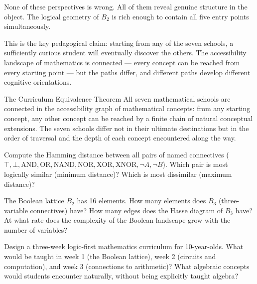 None of these perspectives is wrong. All of them reveal genuine structure
in the object. The logical geometry of $B_2$ is rich enough to contain
all five entry points simultaneously.

This is the key pedagogical claim: starting from any of the seven schools,
a sufficiently curious student will eventually discover the others.
The accessibility landscape of mathematics is connected — every concept
can be reached from every starting point — but the paths differ, and
different paths develop different cognitive orientations.

\begin{namedthm}{The Curriculum Equivalence Theorem}
  All seven mathematical schools are connected in the accessibility
  graph of mathematical concepts: from any starting concept, any other
  concept can be reached by a finite chain of natural conceptual
  extensions. The seven schools differ not in their ultimate destinations
  but in the order of traversal and the depth of each concept encountered
  along the way.
\end{namedthm}

\begin{exercise}
  Compute the Hamming distance between all pairs of named connectives
  ($\top, \bot, \mathrm{AND}, \mathrm{OR}, \mathrm{NAND}, \mathrm{NOR},
  \mathrm{XOR}, \mathrm{XNOR}, \neg A, \neg B$). Which pair is most
  logically similar (minimum distance)? Which is most dissimilar
  (maximum distance)?
\end{exercise}

\begin{exercise}
  The Boolean lattice $B_2$ has 16 elements. How many elements does
  $B_3$ (three-variable connectives) have? How many edges does the
  Hasse diagram of $B_3$ have? At what rate does the complexity of
  the Boolean landscape grow with the number of variables?
\end{exercise}

\begin{exercise}[title={Pedagogical}]
  Design a three-week logic-first mathematics curriculum for 10-year-olds.
  What would be taught in week 1 (the Boolean lattice), week 2
  (circuits and computation), and week 3 (connections to arithmetic)?
  What algebraic concepts would students encounter naturally, without
  being explicitly taught algebra?
\end{exercise}
